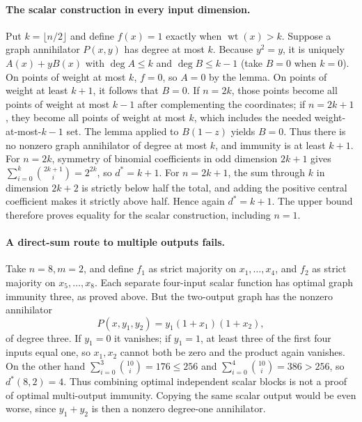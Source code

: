 \documentclass[11pt]{article}
\begin{document}
\paragraph{The scalar construction in every input dimension.}
Put $k=\lfloor n/2\rfloor$ and define $f(x)=1$ exactly when
$\operatorname{wt}(x)>k$. Suppose a graph annihilator $P(x,y)$ has degree
at most $k$. Because $y^2=y$, it is uniquely $A(x)+yB(x)$ with
$\deg A\le k$ and $\deg B\le k-1$ (take $B=0$ when $k=0$).
On points of weight at most $k$, $f=0$, so $A=0$ by the lemma.
On points of weight at least $k+1$, it follows that $B=0$.
If $n=2k$, those points become all points of weight at most $k-1$ after
complementing the coordinates; if $n=2k+1$, they become all points of weight
at most $k$, which includes the needed weight-at-most-$k-1$ set.
The lemma applied to $B(1-z)$ yields $B=0$. Thus there is no nonzero graph
annihilator of degree at most $k$, and immunity is at least $k+1$.
For $n=2k$, symmetry of binomial coefficients in odd dimension $2k+1$ gives
$\sum_{i=0}^k\binom{2k+1}{i}=2^{2k}$, so $d^*=k+1$.
For $n=2k+1$, the sum through $k$ in dimension $2k+2$ is strictly below
half the total, and adding the positive central coefficient makes it strictly
above half. Hence again $d^*=k+1$. The upper bound therefore proves equality
for the scalar construction, including $n=1$.

\paragraph{A direct-sum route to multiple outputs fails.}
Take $n=8,m=2$, and define $f_1$ as strict majority on $x_1,\ldots,x_4$,
and $f_2$ as strict majority on $x_5,\ldots,x_8$.
Each separate four-input scalar function has optimal graph immunity three,
as proved above. But the two-output graph has the nonzero annihilator
\[
P(x,y_1,y_2)=y_1(1+x_1)(1+x_2),
\]
of degree three. If $y_1=0$ it vanishes; if $y_1=1$, at least three of the
first four inputs equal one, so $x_1,x_2$ cannot both be zero and the product
again vanishes. On the other hand
$\sum_{i=0}^3\binom{10}{i}=176\le256$ and
$\sum_{i=0}^4\binom{10}{i}=386>256$, so $d^*(8,2)=4$.
Thus combining optimal independent scalar blocks is not a proof of optimal
multi-output immunity. Copying the same scalar output would be even worse,
since $y_1+y_2$ is then a nonzero degree-one annihilator.
\end{document}
